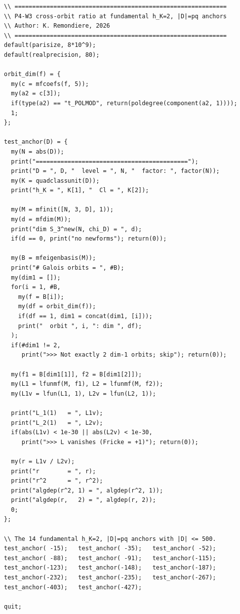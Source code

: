 \documentclass[11pt]{amsart}
\theoremstyle{definition}
\theoremstyle{remark}
\begin{document}
\begin{verbatim}
\\ ============================================================
\\ P4-W3 cross-orbit ratio at fundamental h_K=2, |D|=pq anchors
\\ Author: K. Remondiere, 2026
\\ ============================================================
default(parisize, 8*10^9);
default(realprecision, 80);

orbit_dim(f) = {
  my(c = mfcoefs(f, 5));
  my(a2 = c[3]);
  if(type(a2) == "t_POLMOD", return(poldegree(component(a2, 1))));
  1;
};

test_anchor(D) = {
  my(N = abs(D));
  print("===========================================");
  print("D = ", D, "  level = ", N, "  factor: ", factor(N));
  my(K = quadclassunit(D));
  print("h_K = ", K[1], "  Cl = ", K[2]);

  my(M = mfinit([N, 3, D], 1));
  my(d = mfdim(M));
  print("dim S_3^new(N, chi_D) = ", d);
  if(d == 0, print("no newforms"); return(0));

  my(B = mfeigenbasis(M));
  print("# Galois orbits = ", #B);
  my(dim1 = []);
  for(i = 1, #B,
    my(f = B[i]);
    my(df = orbit_dim(f));
    if(df == 1, dim1 = concat(dim1, [i]));
    print("  orbit ", i, ": dim ", df);
  );
  if(#dim1 != 2,
     print(">>> Not exactly 2 dim-1 orbits; skip"); return(0));

  my(f1 = B[dim1[1]], f2 = B[dim1[2]]);
  my(L1 = lfunmf(M, f1), L2 = lfunmf(M, f2));
  my(L1v = lfun(L1, 1), L2v = lfun(L2, 1));

  print("L_1(1)   = ", L1v);
  print("L_2(1)   = ", L2v);
  if(abs(L1v) < 1e-30 || abs(L2v) < 1e-30,
     print(">>> L vanishes (Fricke = +1)"); return(0));

  my(r = L1v / L2v);
  print("r        = ", r);
  print("r^2      = ", r^2);
  print("algdep(r^2, 1) = ", algdep(r^2, 1));
  print("algdep(r,   2) = ", algdep(r, 2));
  0;
};

\\ The 14 fundamental h_K=2, |D|=pq anchors with |D| <= 500.
test_anchor( -15);   test_anchor( -35);   test_anchor( -52);
test_anchor( -88);   test_anchor( -91);   test_anchor(-115);
test_anchor(-123);   test_anchor(-148);   test_anchor(-187);
test_anchor(-232);   test_anchor(-235);   test_anchor(-267);
test_anchor(-403);   test_anchor(-427);

quit;
\end{verbatim}
\end{document}
